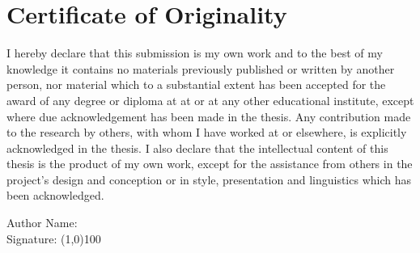 \chapter*{Certificate of Originality}
I hereby declare that this submission is my own work and to the best of my knowledge it contains no materials previously published or written by another person, nor material which to a substantial extent has been accepted for the award of any degree or diploma at \@adviserAffiliation at \@school or at any other educational institute, except where due acknowledgement has been made in the thesis. Any contribution made to the research by others, with whom I have worked at  \@school or elsewhere, is explicitly acknowledged in the thesis. I also declare that the intellectual content of this thesis is the product of my own work, except for the assistance from others in the project's design and conception or in style, presentation and linguistics which has been acknowledged.
\vspace*{10pt}\noindent
\begin{flushright}
Author Name: \textbf{\underline{\@author}} \\
\vspace*{10pt}\noindent
Signature: \line(1,0){100}
\end{flushright}
